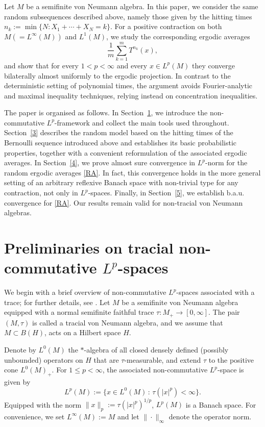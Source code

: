 \documentclass[12pt]{amsart}
\theoremstyle{remark}
\theoremstyle{definition}
\numberwithin{equation}{section}
\begin{document}
Let \(M\) be a semifinite von Neumann algebra. In this paper, we consider the same random subsequences described above, namely those given by the hitting times \(n_k := \min\{N : X_1 + \cdots + X_N = k\}\). For a positive contraction on both \(M(=L^\infty(M))\) and \(L^1(M)\), we study the corresponding ergodic averages
\begin{equation}\label{RA}
\frac{1}{m} \sum_{k=1}^m T^{n_k}(x),
\end{equation}
and show that for every \(1<p<\infty\) and every \(x\in L^p(M)\) they converge bilaterally almost uniformly to the ergodic projection.  In contrast to the deterministic setting of polynomial times, the argument avoids Fourier-analytic and maximal inequality techniques, relying instead on concentration inequalities. 
\smallskip

The paper is organised as follows. In Section~\ref{2}, we introduce the non-commutative \(L^p\)-framework and collect the main tools used throughout. Section~\ref{3} describes the random model based on the hitting times of the Bernoulli sequence introduced above and establishes its basic probabilistic properties, together with a convenient reformulation of the associated ergodic averages. In Section~\ref{4}, we prove almost sure convergence in \(L^p\)-norm for the random ergodic averages \eqref{RA}. In fact, this convergence holds in the more general setting of an arbitrary reflexive Banach space with non-trivial type for any contraction, not only in \(L^p\)-spaces. Finally, in Section~\ref{5}, we establish b.a.u. convergence for \eqref{RA}. Our results remain valid for non-tracial von Neumann algebras.

\section{Preliminaries on tracial non-commutative $L^p$-spaces}\label{2}

We begin with a brief overview of non-commutative $L^p$-spaces associated with a trace; for further details, see \cite{Hiai,PX}. Let $M$ be a semifinite von Neumann algebra equipped with a normal semifinite faithful trace
$\tau \colon M_+ \to [0,\infty]$. The pair $(M,\tau)$ is called a tracial von Neumann algebra, and we assume that $M \subset B(H)$, acts on a Hilbert space $H$.

Denote by $L^0(M)$ the $*$-algebra of all closed densely defined (possibly unbounded) operators on $H$ that are $\tau$-measurable, and extend $\tau$ to the positive cone $L^0(M)_+$. For $1 \le p < \infty$, the associated non-commutative $L^p$-space is given by
$$ L^p(M) := \{x \in L^0(M) \,:\, \tau(|x|^p) < \infty\}.$$
Equipped with the norm 
$\|x\|_p := \tau(|x|^p)^{1/p}$, $L^p(M)$ is a Banach space. 
For convenience, we set $L^\infty(M) := M$ and let $\|\cdot\|_\infty$ 
denote the operator norm.
\end{document}
